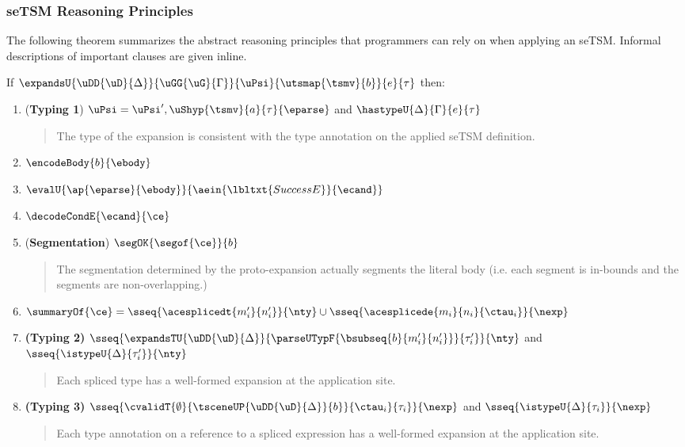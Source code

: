 \documentclass[acmlarge,review,anonymous]{acmart}\settopmatter{printfolios=true}
\begin{document}
\subsubsection{seTSM Reasoning Principles} 
The following theorem summarizes the abstract reasoning principles that programmers can rely on when applying an seTSM. Informal descriptions of important clauses are given inline. 
\begin{theorem}
If $\expandsU{\uDD{\uD}{\Delta}}{\uGG{\uG}{\Gamma}}{\uPsi}{\utsmap{\tsmv}{b}}{e}{\tau}$ then:
\begin{enumerate}[nolistsep]
\item (\textbf{Typing 1}) $\uPsi = \uPsi', \uShyp{\tsmv}{a}{\tau}{\eparse}$ and $\hastypeU{\Delta}{\Gamma}{e}{\tau}$
  \begin{quote}
     The type of the expansion is consistent with the type annotation on the applied seTSM definition.
  \end{quote}
\item $\encodeBody{b}{\ebody}$
\item $\evalU{\ap{\eparse}{\ebody}}{\aein{\lbltxt{SuccessE}}{\ecand}}$
\item $\decodeCondE{\ecand}{\ce}$
\item (\textbf{Segmentation}) $\segOK{\segof{\ce}}{b}$
        \begin{quote}
        The segmentation determined by the proto-expansion actually segments the literal body (i.e. each segment is in-bounds and the segments are non-overlapping.)
        \end{quote}
\item $\summaryOf{\ce} = \sseq{\acesplicedt{m'_i}{n'_i}}{\nty} \cup \sseq{\acesplicede{m_i}{n_i}{\ctau_i}}{\nexp}$
\item \textbf{(Typing 2)} $\sseq{
      \expandsTU{\uDD{\uD}{\Delta}}
      {
        \parseUTypF{\bsubseq{b}{m'_i}{n'_i}}
      }{\tau'_i}
    }{\nty}$ and $\sseq{\istypeU{\Delta}{\tau'_i}}{\nty}$
      \begin{quote}
        Each spliced type has a well-formed expansion at the application site.
      \end{quote}
\item \textbf{(Typing 3)} $\sseq{
  \cvalidT{\emptyset}{
    \tsceneUP
      {\uDD
        {\uD}{\Delta}
      }{b}
  }{
    \ctau_i
  }{\tau_i}
}{\nexp}$ and $\sseq{\istypeU{\Delta}{\tau_i}}{\nexp}$
    \begin{quote}
      Each type annotation on a reference to a spliced expression has a well-formed expansion at the application site.

\end{quote}
\end{enumerate}
\end{theorem}
\end{document}
